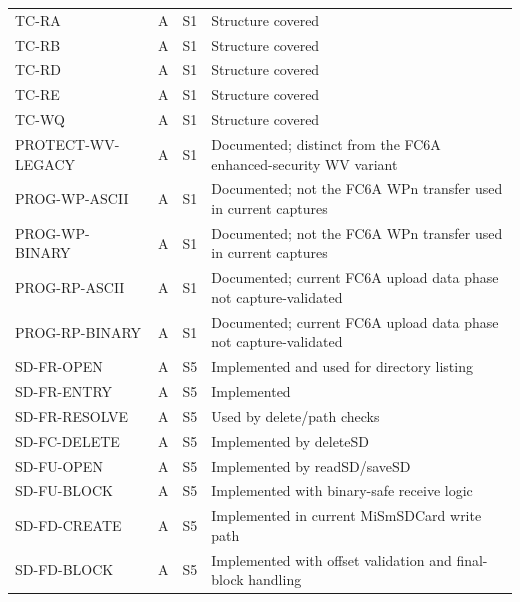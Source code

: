 \documentclass[10pt,letterpaper]{article}
\begin{document}
\begin{longtable}{@{}p{3.5cm}p{1.2cm}p{3.2cm}p{8.0cm}@{}}
TC-RA & A & S1 & Structure covered \\

TC-RB & A & S1 & Structure covered \\

TC-RD & A & S1 & Structure covered \\

TC-RE & A & S1 & Structure covered \\

TC-WQ & A & S1 & Structure covered \\

PROTECT-WV-LEGACY & A & S1 & Documented; distinct from the FC6A enhanced-security WV variant \\

PROG-WP-ASCII & A & S1 & Documented; not the FC6A WPn transfer used in current captures \\

PROG-WP-BINARY & A & S1 & Documented; not the FC6A WPn transfer used in current captures \\

PROG-RP-ASCII & A & S1 & Documented; current FC6A upload data phase not capture-validated \\

PROG-RP-BINARY & A & S1 & Documented; current FC6A upload data phase not capture-validated \\

SD-FR-OPEN & A & S5 & Implemented and used for directory listing \\

SD-FR-ENTRY & A & S5 & Implemented \\

SD-FR-RESOLVE & A & S5 & Used by delete/path checks \\

SD-FC-DELETE & A & S5 & Implemented by deleteSD \\

SD-FU-OPEN & A & S5 & Implemented by readSD/saveSD \\

SD-FU-BLOCK & A & S5 & Implemented with binary-safe receive logic \\

SD-FD-CREATE & A & S5 & Implemented in current MiSmSDCard write path \\

SD-FD-BLOCK & A & S5 & Implemented with offset validation and final-block handling \\


\end{longtable}
\end{document}
